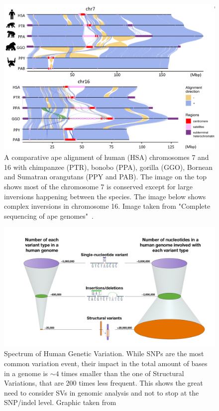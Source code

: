 \begin{figure}[H]
	\centering
	\includegraphics[width=\linewidth]{figures/background/genome_diff.png}
	\caption[Genomic difference in chromosome 7 and 16 of 5 primate species.]{A comparative ape alignment of human (HSA) chromosomes 7 and 16 with chimpanzee (PTR), bonobo (PPA), gorilla (GGO), Bornean and Sumatran orangutans (PPY and PAB). The image on the top shows most of the chromosome 7 is conserved except for large inversions happening between the species. The image below shows complex inversions in chromosome 16. Image taken from "Complete sequencing of ape genomes"~\cite{ape_genomes}.}
	\label{fig:chromosome_diff}
\end{figure}

\begin{figure}[H]
	\centering
	\includegraphics[width=.95\linewidth]{figures/background/genomic_spectrum.png}
	\caption[Spectrum of Human Genetic Variation.]{Spectrum of Human Genetic Variation. While SNPs are the most common variation event, their impact in the total amount of bases in a genome is $\sim4$ times smaller than the one of Structural Variations, that are 200 times less frequent. This shows the great need to consider SVs in genomic analysis and not to stop at the SNP/indel level. Graphic taken from~\cite{nih_variation}\\}
	\label{fig:variation_spectrum}
\end{figure}

